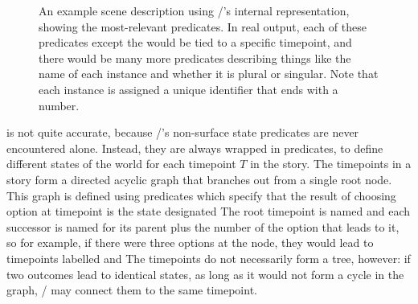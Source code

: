 \begin{figure}[!b]
\centering
{}
\caption[\dunyazad/ state example]{An example scene description using \dunyazad/'s internal representation, showing the most-relevant predicates. In real output, each of these predicates except the  would be tied to a specific timepoint, and there would be many more  predicates describing things like the name of each instance and whether it is plural or singular. Note that each instance is assigned a unique identifier that ends with a number.}
\label{fig:dunyazad-state-example}
\end{figure}


 is not quite accurate, because \dunyazad/'s non-surface state predicates are never encountered alone.
%
Instead, they are always wrapped in  predicates, to define different states of the world for each timepoint $T$ in the story.
%
The timepoints in a story form a directed acyclic graph that branches out from a single root node.
%
This graph is defined using  predicates which specify that the result of choosing option  at timepoint  is the state designated 
%
The root timepoint is named  and each successor is named for its parent plus the number of the option that leads to it, so for example, if there were three options at the  node, they would lead to timepoints labelled   and 
%
The timepoints do not necessarily form a tree, however: if two outcomes lead to identical states, as long as it would not form a cycle in the graph, \dunyazad/ may connect them to the same timepoint.


